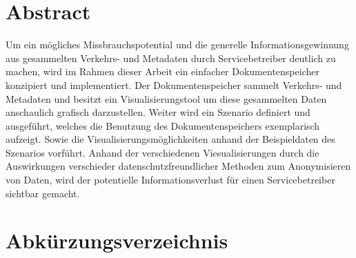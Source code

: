 \documentclass[
    fontsize=12pt,
    headings=small,
    parskip=half,           %
    bibliography=totoc,
    numbers=noenddot,       %
    open=any,               %
    ]{scrreprt}
\begin{document}
\chapter*{Abstract}
Um ein mögliches Missbrauchspotential und die generelle Informationsgewinnung aus gesammelten Verkehrs- und Metadaten durch Servicebetreiber deutlich zu machen, wird im Rahmen dieser Arbeit ein einfacher Dokumentenspeicher konzipiert und implementiert.
Der Dokumentenspeicher sammelt Verkehrs- und Metadaten und besitzt ein Visualisierungstool um diese gesammelten Daten anschaulich grafisch darzustellen.
Weiter wird ein Szenario definiert und ausgeführt, welches die Benutzung des Dokumentenspeichers exemplarisch aufzeigt.
Sowie die Visualisierungsmöglichkeiten anhand der Beispieldaten des Szenarios vorführt.
Anhand der verschiedenen Viesualisierungen durch die Auswirkungen verschieder datenschutzfreundlicher Methoden zum Anonymisieren von Daten, wird der potentielle Informationsverlust für einen Servicebetreiber sichtbar gemacht.

\tableofcontents
\listoffigures
\chapter*{Abkürzungsverzeichnis}
\begin{acronym}
\end{acronym}
\end{document}
